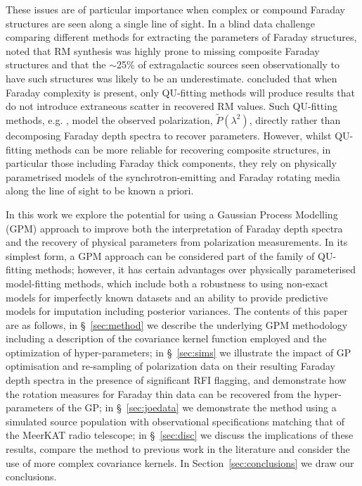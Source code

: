 \documentclass[fleqn,usenatbib]{mnras}
\begin{document}
These issues are of particular importance when complex or compound Faraday structures are seen along a single line of sight. In a blind data challenge comparing different methods for extracting the parameters of Faraday structures, \cite{Sun_2015} noted that RM synthesis was highly prone to missing composite Faraday structures and that the $\sim$25\% of extragalactic sources seen observationally to have such structures \citep{law2011} was likely to be an underestimate. \cite{Sun_2015} concluded that when Faraday complexity is present, only QU-fitting methods will produce results that do not introduce extraneous scatter in recovered RM values. Such QU-fitting methods, e.g. \cite{Farnsworth_2011, 10.1111/j.1365-2966.2012.20554.x, 2014ApJ...792...51I}, model the observed polarization, $\tilde{P}(\lambda^2)$, directly rather than decomposing Faraday depth spectra to recover parameters. However, whilst QU-fitting methods can be more reliable for recovering composite structures, in particular those including Faraday thick components, they rely on physically parametrised models of the synchrotron-emitting and Faraday rotating media along the line of sight to be known a priori.

In this work we explore the potential for using a Gaussian Process Modelling (GPM) approach to improve both the interpretation of Faraday depth spectra and the recovery of physical parameters from polarization measurements. In its simplest form, a GPM approach can be considered part of the family of QU-fitting methods; however, it has certain advantages over physically parameterised model-fitting methods, which include both a robustness to using non-exact models for imperfectly known datasets and an ability to provide predictive models for imputation including posterior variances.  The contents of this paper are as follows, in \S~\ref{sec:method} we describe the underlying GPM methodology including a description of the covariance kernel function employed and the optimization of hyper-parameters; in \S~\ref{sec:sims} we illustrate the impact of GP optimisation and re-sampling of polarization data on their resulting Faraday depth spectra in the presence of significant RFI flagging, and demonstrate how the rotation measures for Faraday thin data can be recovered from the hyper-parameters of the GP; in \S~\ref{sec:joedata} we demonstrate the method using a simulated source population with observational specifications matching that of the MeerKAT radio telescope; in \S~\ref{sec:disc} we discuss the implications of these results, compare the method to previous work in the literature and consider the use of more complex covariance kernels. In Section~\ref{sec:conclusions} we draw our conclusions.
\end{document}

